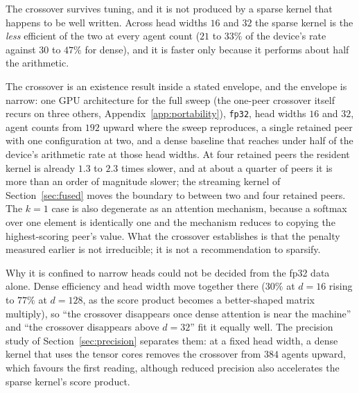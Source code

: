 The crossover survives tuning, and it is not produced by a sparse kernel that
happens to be well written. Across head widths $16$ and $32$ the sparse kernel
is the \emph{less} efficient of the two at every agent count ($21$ to $33\%$
of the device's rate against $30$ to $47\%$ for dense), and it is faster only
because it performs about half the arithmetic.

The crossover is an existence result inside a stated envelope, and the envelope
is narrow: one GPU architecture for the full sweep (the one-peer crossover itself
recurs on three others, Appendix~\ref{app:portability}), \texttt{fp32}, head widths $16$ and $32$, agent
counts from $192$ upward where the sweep reproduces, a single retained peer with
one configuration at two, and a dense baseline that reaches under half of the
device's arithmetic rate at those head widths. At four retained peers the resident
kernel is already $1.3$ to $2.3$ times slower, and at about a quarter of peers it is
more than an order of magnitude slower; the streaming kernel of
Section~\ref{sec:fused} moves the boundary to between two and four retained
peers. The $k{=}1$ case is also degenerate as
an attention mechanism, because a softmax over one element is identically one
and the mechanism reduces to copying the highest-scoring peer's value. What the
crossover establishes is that the penalty measured earlier is not irreducible;
it is not a recommendation to sparsify.

Why it is confined to narrow heads could not be decided from the fp32 data
alone. Dense efficiency and head width move together there ($30\%$ at
$d{=}16$ rising to $77\%$ at $d{=}128$, as the score product becomes a
better-shaped matrix multiply), so ``the crossover disappears once dense
attention is near the machine'' and ``the crossover disappears above $d{=}32$''
fit it equally well. The precision study of Section~\ref{sec:precision}
separates them: at a fixed head width, a dense kernel that uses the tensor cores
removes the crossover from $384$ agents upward, which favours the first
reading, although reduced precision also accelerates the sparse kernel's score
product.

\begin{table}[t]
\centering\small
\caption{Three ways of reaching the same retained set, at the two agent counts
that carry the crossover. Repeated argmax keeps the aggregation sparse and pays
linearly in the number retained; bisecting on the score's bit pattern is flat in
it and pays the dense aggregation; sorting score--index pairs once is flat and
sparse at the same time, and is not competitive with either at the agent counts
where a sort no longer fits alongside a useful block of queries.}
\label{tab:selection}

\end{table}

